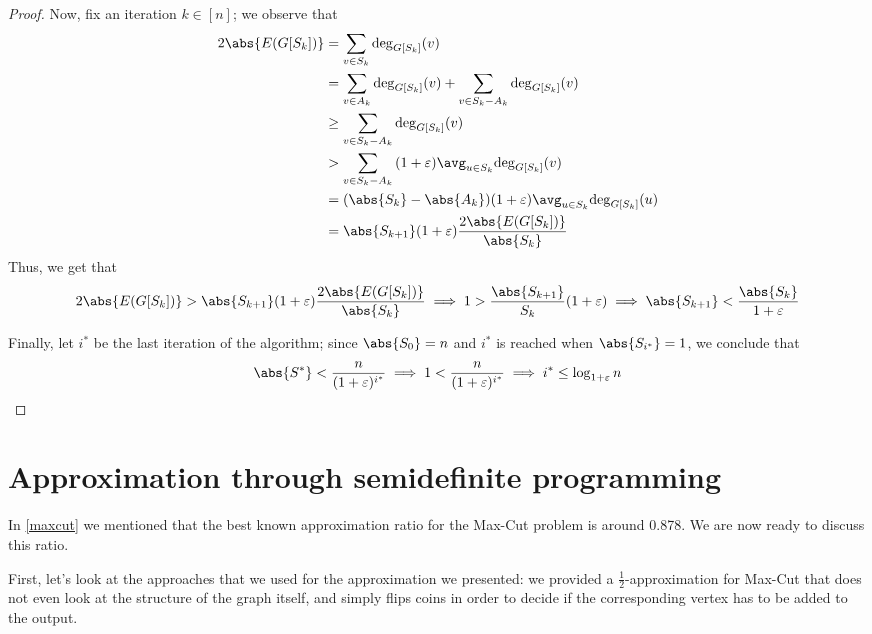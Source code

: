 \documentclass[a4paper, 12pt]{report}
\begin{document}
\begin{proof}
        Now, fix an iteration $k \in [n]$; we observe that
        \begin{equation*}
            \begin{split}
                2 \abs{E(G[S_k])} &= \sum_{v \in S_k}{\deg_{G[S_k]}(v)} \\
                                  &= \sum_{v \in A_k}{\deg_{G[S_k]}(v)} + \sum_{v \in S_k - A_k}{\deg_{G[S_k]}(v)} \\
                                  &\ge \sum_{v \in S_k - A_k}{\deg_{G[S_k]}(v)} \\
                                  &> \sum_{v \in S_k - A_k}{(1 + \varepsilon) \avg_{ u \in S_k}{\deg_{G[S_k]}(v)}} \\
                                  &= (\abs {S_k} - \abs{A_k})(1 + \varepsilon) \avg_{u \in S_k}{\deg_{G[S_k]}(u)} \\
                                  &= \abs{S_{k + 1}}(1 + \varepsilon) \dfrac{2 \abs{E(G[S_k])}}{\abs{S_k}}
            \end{split}
        \end{equation*}
        Thus, we get that $$2 \abs{E(G[S_k])} > \abs{S_{k + 1}} (1 + \varepsilon)\dfrac{2 \abs{E(G[S_k])}}{\abs{S_k}} \implies 1 > \dfrac{\abs{S_{k + 1}}}{S_k}(1 + \varepsilon) \implies \abs{S_{k + 1}} < \dfrac{\abs{S_k}}{1 + \varepsilon}$$

        Finally, let $i^*$ be the last iteration of the algorithm; since $\abs{S_0} = n$ and $i^*$ is reached when $\abs{S_{i^*}} = 1$, we conclude that $$\abs{S^*} < \dfrac{n}{(1 + \varepsilon)^{i^*}} \implies 1 < \dfrac{n}{(1 + \varepsilon)^{i^*}} \implies i^* \le \log_{1 + \varepsilon}{n}$$
    \end{proof}

    \section{Approximation through semidefinite programming}

    In \cref{maxcut} we mentioned that the best known approximation ratio for the Max-Cut problem is around 0.878. We are now ready to discuss this ratio.

    First, let's look at the approaches that we used for the approximation we presented: we provided a $\tfrac{1}{2}$-approximation for Max-Cut that does not even look at the structure of the graph itself, and simply flips coins in order to decide if the corresponding vertex has to be added to the output.
\end{document}
